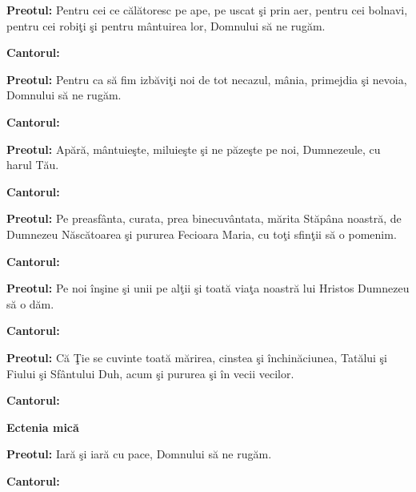 \documentclass[11pt,letterpaper]{book} \usepackage{ucs}
\newcommand{\mysection}[1]{\begin{center}{\Large \bf #1}\end{center}}
\begin{document}
  {\bf Preotul:} Pentru cei ce călătoresc pe ape, pe uscat şi prin
  aer, pentru cei bolnavi, pentru cei robiţi şi pentru mântuirea lor,
  Domnului să ne rugăm.

  {\bf Cantorul:}
  \begin{center}
  \end{center}

  {\bf Preotul:} Pentru ca să fim izbăviţi noi de tot necazul, mânia,
  primejdia şi nevoia, Domnului să ne rugăm.

  {\bf Cantorul:}
  \begin{center}
  \end{center}

  {\bf Preotul:} Apără, mântuieşte, miluieşte şi ne păzeşte pe noi,
  Dumnezeule, cu harul Tău.
  \pagebreak

  {\bf Cantorul:}
  \begin{center}
  \end{center}

  {\bf Preotul:} Pe preasfânta, curata, prea binecuvântata, mărita
  Stăpâna noastră, de Dumnezeu Născătoarea şi pururea Fecioara Maria,
  cu toţi sfinţii să o pomenim.

  {\bf Cantorul:}


  {\bf Preotul:} Pe noi înşine şi unii pe alţii şi toată viaţa noastră
  lui Hristos Dumnezeu să o dăm.

  {\bf Cantorul:}
  \begin{center}
  \end{center}

  {\bf Preotul:} Că Ţie se cuvinte toată mărirea, cinstea şi
  închinăciunea, Tatălui şi Fiului şi Sfântului Duh, acum şi pururea
  şi în vecii vecilor.

  {\bf Cantorul:}
  \begin{center}
  \end{center}
  \pagebreak


  \mysection{Ectenia mică}
  
  {\bf Preotul:} Iară şi iară cu pace, Domnului să ne rugăm.

  {\bf Cantorul:}
  \begin{center}
  \end{center}
\end{document}
